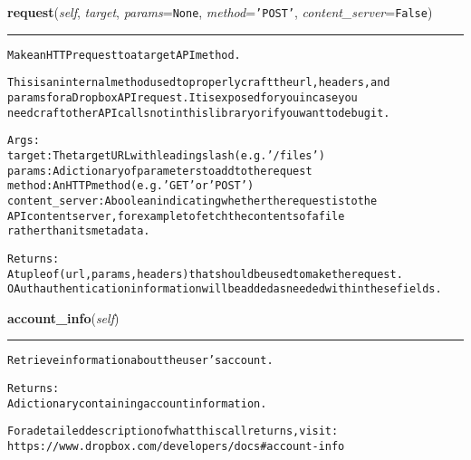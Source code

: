 \hspace{.8\funcindent}\begin{boxedminipage}{\funcwidth}

    \raggedright \textbf{request}(\textit{self}, \textit{target}, \textit{params}={\tt None}, \textit{method}={\tt \texttt{'}\texttt{POST}\texttt{'}}, \textit{content\_server}={\tt False})

    \vspace{-1.5ex}

    \rule{\textwidth}{0.5\fboxrule}
\setlength{\parskip}{2ex}
\begin{alltt}
Make an HTTP request to a target API method.

This is an internal method used to properly craft the url, headers, and
params for a Dropbox API request.  It is exposed for you in case you
need craft other API calls not in this library or if you want to debug it.

Args:
    target: The target URL with leading slash (e.g. '/files')
    params: A dictionary of parameters to add to the request
    method: An HTTP method (e.g. 'GET' or 'POST')
    content\_server: A boolean indicating whether the request is to the
       API content server, for example to fetch the contents of a file
       rather than its metadata.

Returns:
    A tuple of (url, params, headers) that should be used to make the request.
    OAuth authentication information will be added as needed within these fields.
\end{alltt}

\setlength{\parskip}{1ex}
    \end{boxedminipage}

    \label{lib:dropbox:DropboxClient:account_info}

    \vspace{0.5ex}

\hspace{.8\funcindent}\begin{boxedminipage}{\funcwidth}

    \raggedright \textbf{account\_info}(\textit{self})

    \vspace{-1.5ex}

    \rule{\textwidth}{0.5\fboxrule}
\setlength{\parskip}{2ex}
\begin{alltt}
Retrieve information about the user's account.

Returns:
    A dictionary containing account information.

    For a detailed description of what this call returns, visit:
    https://www.dropbox.com/developers/docs\#account-info
\end{alltt}

\setlength{\parskip}{1ex}
    \end{boxedminipage}

